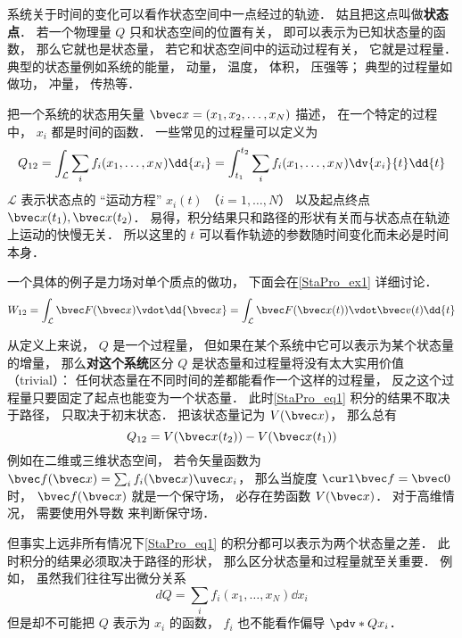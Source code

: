 

系统关于时间的变化可以看作状态空间中一点经过的轨迹． 姑且把这点叫做\textbf{状态点}． 若一个物理量 $Q$ 只和状态空间的位置有关， 即可以表示为已知状态量的函数， 那么它就也是状态量， 若它和状态空间中的运动过程有关， 它就是过程量． 典型的状态量例如系统的能量， 动量， 温度， 体积， 压强等； 典型的过程量如做功， 冲量， 传热等．

把一个系统的状态用矢量 $\bvec x = (x_1, x_2, \dots, x_N)$ 描述， 在一个特定的过程中， $x_i$ 都是时间的函数． 一些常见的过程量可以定义为
\begin{equation}\label{StaPro_eq1}
Q_{12} = \int_{\mathcal L} \sum_i f_i(x_1, \dots, x_N) \dd{x_i} = \int_{t_1}^{t_2} \sum_i f_i(x_1, \dots, x_N) \dv{x_i}{t} \dd{t}
\end{equation}
$\mathcal L$ 表示状态点的 “运动方程” $x_i(t)$ （$i = 1,\dots, N$） 以及起点终点 $\bvec x(t_1), \bvec x(t_2)$． 易得，积分结果只和路径的形状有关而与状态点在轨迹上运动的快慢无关． 所以这里的 $t$ 可以看作轨迹的参数随时间变化而未必是时间本身．

一个具体的例子是力场对单个质点的做功， 下面会在\autoref{StaPro_ex1} 详细讨论．
\begin{equation}
W_{12} = \int_{\mathcal L} \bvec F(\bvec x) \vdot \dd{\bvec x} = \int_{\mathcal L} \bvec F(\bvec x(t)) \vdot \bvec v(t) \dd{t}
\end{equation}


从定义上来说， $Q$ 是一个过程量， 但如果在某个系统中它可以表示为某个状态量的增量， 那么\textbf{对这个系统}区分 $Q$ 是状态量和过程量将没有太大实用价值（trivial）： 任何状态量在不同时间的差都能看作一个这样的过程量， 反之这个过程量只要固定了起点也能变为一个状态量． 此时\autoref{StaPro_eq1} 积分的结果不取决于路径， 只取决于初末状态． 把该状态量记为 $V(\bvec x)$， 那么总有
\begin{equation}
Q_{12} = V(\bvec x(t_2)) - V(\bvec x(t_1))
\end{equation}
例如在二维或三维状态空间， 若令矢量函数为 $\bvec f(\bvec x) = \sum_i f_i(\bvec x) \uvec x_i$， 那么当旋度 $\curl \bvec f = \bvec 0$ 时， $\bvec f(\bvec x)$ 就是一个保守场， 必存在势函数 $V(\bvec x)$． 对于高维情况， 需要使用外导数 来判断保守场．

但事实上远非所有情况下\autoref{StaPro_eq1} 的积分都可以表示为两个状态量之差． 此时积分的结果必须取决于路径的形状， 那么区分状态量和过程量就至关重要． 例如， 虽然我们往往写出微分关系
\begin{equation}
dQ = \sum_i f_i(x_1, \dots, x_N) \dd{x_i}
\end{equation}
但是却不可能把 $Q$ 表示为 $x_i$ 的函数， $f_i$ 也不能看作偏导 $\pdv*{Q}{x_i}$．

